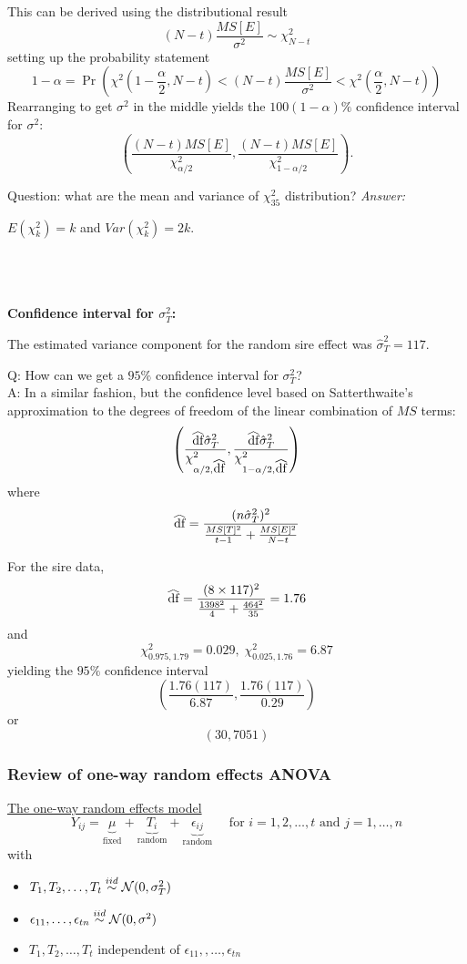 This can be derived using the distributional result
$$
(N - t)\frac{MS[E]}{\sigma^2} \sim \chi_{N - t}^2
$$
setting up the probability statement
$$
1 - \alpha = \Pr\left(\chi^2(1 - \frac{\alpha}{2}, N - t) < (N - t)\frac{MS[E]}{\sigma^2} < \chi^2(\frac{\alpha}{2}, N - t)\right)
$$
Rearranging to get $\sigma^2$ in the middle yields the $100(1 - \alpha)\%$ confidence interval for $\sigma^2$:
$$
\left(\frac{(N - t)MS[E]}{\chi_{\alpha / 2}^2}, \frac{(N - t)MS[E]}{\chi_{1 - \alpha / 2}^2} \right).
$$

Question: what are the mean and variance of $\chi_{35}^2$ distribution?
{\it Answer: }\\
\begin{pf}
	$\textit{E}(\chi_{k}^2) = k$ and 	$\textit{Var}(\chi_{k}^2) = 2k$.
\end{pf}
\\
\\
\\
{\bf Confidence interval for $\sigma_T^2$:}

The estimated variance component for the random sire effect was $\hat{\sigma}_T^2 = 117$.

Q: How can we get a $95\%$ confidence interval for $\sigma_T^2$?\\
A:  In a similar fashion, but the confidence level based on Satterthwaite's approximation to the degrees of freedom of the linear combination of $MS$ terms:
$$
\left( \frac{\reallywidehat{df} \hat{\sigma}_T^2}{\chi_{\alpha/2, \reallywidehat{df}}^2} , \frac{\reallywidehat{df} \hat{\sigma}_T^2}{\chi_{1 - \alpha/2, \reallywidehat{df}}^2} \right)
$$
where
$$
\reallywidehat{df} = \frac{(n \hat{\sigma}_T^2)^2}{\frac{MS[T]^2}{t - 1} + \frac{MS[E]^2}{N - t}}
$$

For the sire data,
$$
\reallywidehat{df} = \frac{(8 \times 117)^2}{\frac{1398^2}{4} + \frac{464^2}{35}} = 1.76
$$
and
$$
\chi_{0.975, 1.79}^2 = 0.029, \; \chi_{0.025, 1.76}^2 = 6.87
$$
yielding the $95\%$ confidence interval
$$
\left(\frac{1.76(117)}{6.87}, \frac{1.76(117)}{0.29} \right)
$$
or
$$
(30, 7051)
$$
\newpage
\subsubsection*{Review of one-way random effects ANOVA}

\underline{The one-way random effects model}
$$
Y_{ij} = \underbrace{\mu}_{\mbox{fixed}} + \underbrace{T_i}_{\mbox{random}} + \underbrace{\epsilon_{ij}}_{\mbox{random}}  \quad \mbox{ for } i = 1, 2, \dots, t \mbox{ and }  j = 1, \dots, n
$$
with
\begin{itemize}
	\item $T_1, T_2, \dots, T_t \overset{iid}{\sim} \mathcal{N}(0, \sigma_T^2)$
	\item $\epsilon_{11}, \dots, \epsilon_{tn} \overset{iid}{\sim} \mathcal{N}(0, \sigma^2)$
	\item $T_1, T_2, \dots, T_t$ independent of $\epsilon_{11},, \dots, \epsilon_{tn}$
\end{itemize}

